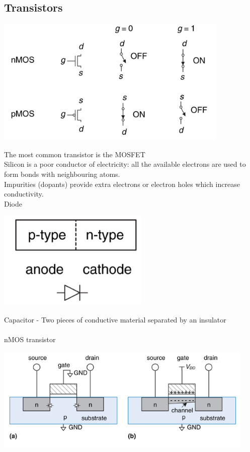 \documentclass{article}[18pt]
\begin{document}
\subsection{Transistors}
\begin{center}
	\includegraphics[scale=0.7]{transistors}
\end{center}
The most common transistor is the MOSFET\\
Silicon is a poor conductor of electricity: all the available electrons are used to form bonds with neighbouring atoms.\\
Impurities (dopants) provide extra electrons or electron holes which increase conductivity.\\
Diode
\begin{center}
	\includegraphics[scale=0.7]{diode}
\end{center}
Capacitor - Two pieces of conductive material separated by an insulator\\
\\
nMOS transistor
\begin{center}
	\includegraphics[scale=0.7]{nMOS}
\end{center}
\end{document}
